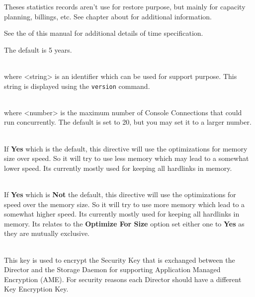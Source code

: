 \begin{description}
Theses statistics records aren't use for restore purpose, but mainly for
capacity planning, billings, etc.
See chapter about 
 for additional information.

See the  of this manual for additional
details of time specification.

The default is 5 years.

\item [VerId = {\textless}string{\textgreater}] \hfill \\
where  {\textless}string{\textgreater} is an identifier which can be used for support purpose.
This string is displayed using the \texttt{version} command.

\item [MaximumConsoleConnections = {\textless}number{\textgreater}] \hfill \\
where {\textless}number{\textgreater}  is the maximum number of Console Connections that
could run  concurrently. The default is set to 20, but you may set it to a
larger number.

\item [Optimize For Size = {\textless}yes{\textbar}no{\textgreater}] \hfill \\
If {\bf Yes} which is the default, this directive will use the optimizations
for memory size over speed. So it will try to use less memory which may lead
to a somewhat lower speed. Its currently mostly used for keeping all hardlinks
in memory.

\item [Optimize For Speed = {\textless}yes{\textbar}no{\textgreater}] \hfill \\
If {\bf Yes} which is {\bf Not} the default, this directive will use the
optimizations for speed over the memory size. So it will try to use more memory
which lead to a somewhat higher speed. Its currently mostly used for keeping all
hardlinks in memory. Its relates to the {\bf Optimize For Size} option set either
one to {\bf Yes} as they are mutually exclusive.

\item [Key Encryption Key = {\textless}KeyEncryptionKey{\textgreater}] \hfill \\
This key is used to encrypt the Security Key that is exchanged between
the Director and the Storage Daemon for supporting Application Managed
Encryption (AME). For security reasons each Director should have a
different Key Encryption Key.


\end{description}
